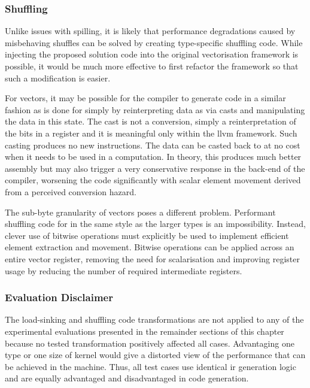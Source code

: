 \documentclass[\main/thesis.tex]{subfiles}
\begin{document}
\subsubsection{Shuffling}
Unlike issues with spilling, it is likely that performance degradations caused by misbehaving shuffles can be solved by creating type-specific shuffling code.
While injecting the proposed solution code into the original vectorisation framework is possible, it would be much more effective to first refactor the framework so that such a modification is easier.

For  vectors, it may be possible for the compiler to generate code in a similar fashion as is done for  simply by reinterpreting data as  via casts and manipulating the data in this state.
The cast is not a conversion, simply a reinterpretation of the bits in a register and it is meaningful only within the \gls{llvm} framework.
Such casting produces no new instructions.
The data can be casted back to  at no cost when it needs to be used in a computation.
In theory, this produces much better assembly but may also trigger a very conservative response in the back-end of the compiler, worsening the code significantly with scalar element movement derived from a perceived conversion hazard.

The sub-byte granularity of  vectors poses a different problem.
Performant shuffling code for  in the same style as the larger types is an impossibility.
Instead, clever use of bitwise operations must explicitly be used to implement efficient element extraction and movement.
Bitwise operations can be applied across an entire vector register, removing the need for scalarisation and improving register usage by reducing the number of required intermediate registers.

\subsubsection{Evaluation Disclaimer}
The load-sinking and shuffling code transformations are not applied to any of the experimental evaluations presented in the remainder sections of this chapter  because no tested transformation positively affected all cases.
Advantaging one type or one size of kernel would give a distorted view of the performance that can be achieved in the machine.
Thus, all test cases use identical \gls{ir} generation logic and are equally advantaged and disadvantaged in code generation.
\end{document}
